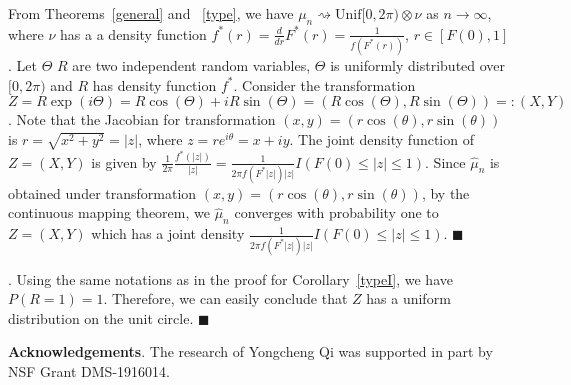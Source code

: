 \documentclass[11pt]{article}
\numberwithin{equation}{section}
\begin{document}
\vspace{10pt}

 From
Theorems~\ref{general} and ~\ref{type}, we have  $\mu_n
\rightsquigarrow \mathrm{Unif}[0,2 \pi)\otimes \nu$ as $n\to\infty$,
where $\nu$ has a a density function
$f^*(r)=\frac{d}{dr}F^*(r)=\frac{1}{f(F^*(r))}$, $r\in [F(0),1]$.
Let $\Theta$ $R$ are two independent random variables, $\Theta$ is
uniformly distributed over $[0,2\pi)$ and $R$ has density function
$f^*$. Consider the transformation
$Z=R\exp(i\Theta)=R\cos(\Theta)+iR\sin(\Theta)=(R\cos(\Theta),
R\sin(\Theta))=:(X,Y)$. Note that the Jacobian for transformation
$(x,y)=(r\cos(\theta), r\sin(\theta))$ is $r=\sqrt{x^2+y^2}=|z|$,
where $z=re^{i\theta}=x+iy$. The joint density function of $Z=(X,Y)$
is given by $\frac{1}{2\pi}\frac{f^*(|z|)}{|z|}=\frac{1}{2\pi
f(F^*|z|)|z|}I(F(0)\le |z|\le 1)$.  Since $\hat\mu_n$ is obtained
under transformation $(x,y)=(r\cos(\theta), r\sin(\theta))$, by the
continuous mapping theorem, we $\hat\mu_n$ converges with
probability one to $Z=(X, Y)$ which has a joint density
$\frac{1}{2\pi f(F^*|z|)|z|}I(F(0)\le |z|\le 1)$.
\hfill$\blacksquare$

\vspace{10pt} . Using
the same notations as in the proof for Corollary~\ref{typeI}, we
have $P(R=1)=1$. Therefore, we can easily conclude that $Z$ has a
uniform distribution on the unit circle.   \hfill$\blacksquare$


\vspace{20pt}

\noindent\textbf{Acknowledgements}.
The research of Yongcheng Qi was supported in part by NSF Grant
DMS-1916014.



\baselineskip 12pt
\def\ref{\par\noindent\hangindent 25pt}
\end{document}

